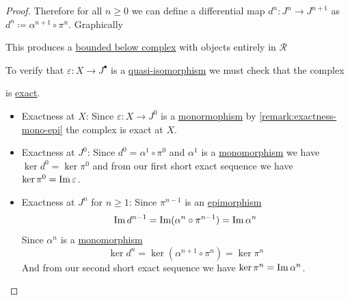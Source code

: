 \documentclass[../../../main]{subfiles}
\begin{document}
\begin{proof}
  Therefore for all \(n \geq 0\) we can define a differential map \(d^{n}: J^{n} \to J^{n+1}\) as \(d^{n} \coloneq \alpha^{n+1} \circ \pi^{n}\).
  Graphically
  \begin{center}
  \end{center}
  This produces a \hyperref[def:bounded-complexes]{bounded below complex} with objects entirely in \(\mathcal{R}\)
  \begin{center}
  \end{center}
  To verify that \(\varepsilon: X \to J^{\bullet}\) is a \hyperref[def:quasi-isomorphism]{quasi-isomorphism} we must check that the complex
  \begin{center}
  \end{center}
  is \hyperref[def:exact-complex]{exact}.
  \begin{itemize}
    \item Exactness at \(X\): Since \(\varepsilon: X \to J^{0}\) is a \hyperref[def:mono-epi-morphism]{monormophism} by \autoref{remark:exactness-mono-epi} the complex is exact at \(X\).
    \item Exactness at \(J^{0}\): Since \(d^{0} = \alpha^{1} \circ \pi^{0}\) and \(\alpha^{1}\) is a \hyperref[def:mono-epi-morphism]{monomorphism} we have \(\ker d^{0} = \ker \pi^{0}\) and from our first short exact sequence we have \(\ker \pi^{0} = \operatorname*{Im} \varepsilon\).
    \item Exactness at \(J^{n}\) for \(n \geq 1\): Since \(\pi^{n-1}\) is an \hyperref[def:mono-epi-morphism]{epimorphism}
          \begin{equation*}
            \operatorname*{Im} d^{n-1} = \operatorname*{Im} (\alpha^{n} \circ \pi^{n-1}) = \operatorname*{Im} \alpha^{n}
          \end{equation*}
          Since \(\alpha^{n}\) is a \hyperref[def:mono-epi-morphism]{monomorphism}
          \begin{equation*}
            \ker d^{n} = \ker (\alpha^{n+1} \circ \pi^{n}) = \ker \pi^{n}
          \end{equation*}
          And from our second short exact sequence we have \(\ker \pi^{n} = \operatorname*{Im} \alpha^{n}\).
  \end{itemize}
\end{proof}
\end{document}
